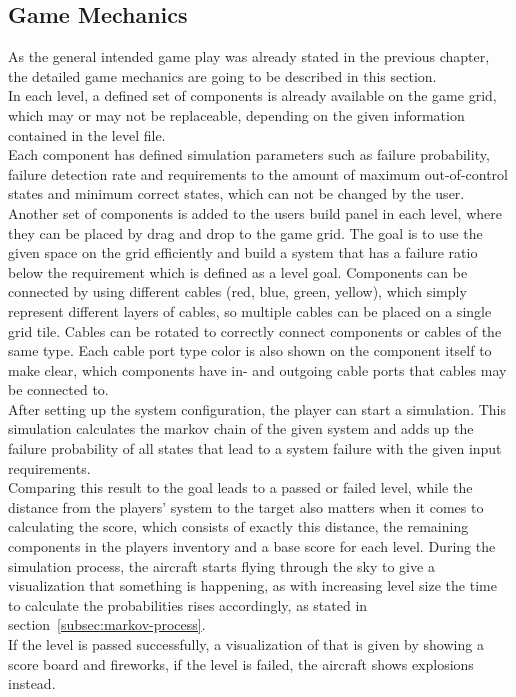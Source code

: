 \subsection{Game Mechanics}\label{subsec:game-mechanics}
As the general intended game play was already stated in the previous chapter, the detailed game mechanics are going to be described in this section.
\\
In each level, a defined set of components is already available on the game grid, which may or may not be replaceable, depending on the given
information contained in the level file.
\\
Each component has defined simulation parameters such as failure probability, failure detection rate and requirements to the amount of
maximum out-of-control states and minimum correct states, which can not be changed by the user.
Another set of components is added to the users build panel in each level, where they can be placed by drag and drop to the game grid.
The goal is to use the given space on the grid efficiently and build a system that has a failure ratio below the requirement which is defined as a level goal.
Components can be connected by using different cables (red, blue, green, yellow), which simply represent different layers of cables, so multiple
cables can be placed on a single grid tile.
Cables can be rotated to correctly connect components or cables of the same type.
Each cable port type color is also shown on the component itself to make clear, which components have in- and outgoing cable ports
that cables may be connected to.
\\
After setting up the system configuration, the player can start a simulation.
This simulation calculates the markov chain of the given system and adds up the failure probability of all states that lead to a system failure with the given
input requirements.
\\
Comparing this result to the goal leads to a passed or failed level, while the distance from the players' system to the target also matters when it comes to calculating
the score, which consists of exactly this distance, the remaining components in the players inventory and a base score for each level.
During the simulation process, the aircraft starts flying through the sky to give a visualization that something is happening, as with increasing
level size the time to calculate the probabilities rises accordingly, as stated in section~\ref{subsec:markov-process}.
\\
If the level is passed successfully, a visualization of that is given by showing a score board and fireworks, if the level is failed, the aircraft
shows explosions instead.

